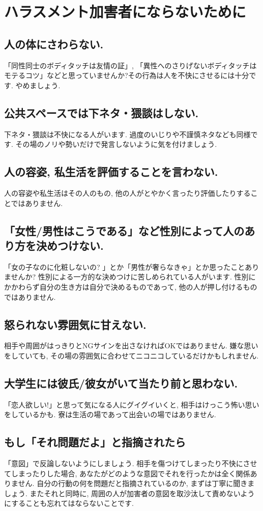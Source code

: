 \section{ハラスメント加害者にならないために}
\label{sec:harassment}

  \subsection{人の体にさわらない. }
  「同性同士のボディタッチは友情の証」, 「異性へのさりげないボディタッチはモテるコツ」などと思っていませんか?その行為は人を不快にさせるには十分です. やめましょう.
  
  \subsection{公共スペースでは下ネタ・猥談はしない. }
  下ネタ・猥談は不快になる人がいます. 過度のいじりや不謹慎ネタなども同様です. その場のノリや勢いだけで発言しないように気を付けましょう. 
  
  \subsection{人の容姿, 私生活を評価することを言わない. }
  人の容姿や私生活はその人のもの, 他の人がとやかく言ったり評価したりすることではありません. 
  
  \subsection{「女性/男性はこうである」など性別によって人のあり方を決めつけない.}
  「女の子なのに化粧しないの? 」とか「男性が奢らなきゃ」とか思ったことありませんか? 性別による一方的な決めつけに苦しめられている人がいます. 性別にかかわらず自分の生き方は自分で決めるものであって, 他の人が押し付けるものではありません. 
  
  \subsection{怒られない雰囲気に甘えない. }
  相手や周囲がはっきりとNGサインを出さなければOKではありません. 嫌な思いをしていても, その場の雰囲気に合わせてニコニコしているだけかもしれません. 
  
  \subsection{大学生には彼氏/彼女がいて当たり前と思わない. }
  「恋人欲しい!」と思って気になる人にグイグイいくと, 相手はけっこう怖い思いをしているかも. 寮は生活の場であって出会いの場ではありません.
  
  \subsection{もし「それ問題だよ」と指摘されたら}
  「意図」で反論しないようにしましょう. 相手を傷つけてしまったり不快にさせてしまったりした場合, あなたがどのような意図でそれを行ったかは全く関係ありません. 自分の行動の何を問題だと指摘されているのか, まずは丁寧に聞きましょう. またそれと同時に, 周囲の人が加害者の意図を取沙汰して責めないようにすることも忘れてはならないことです. 

  
